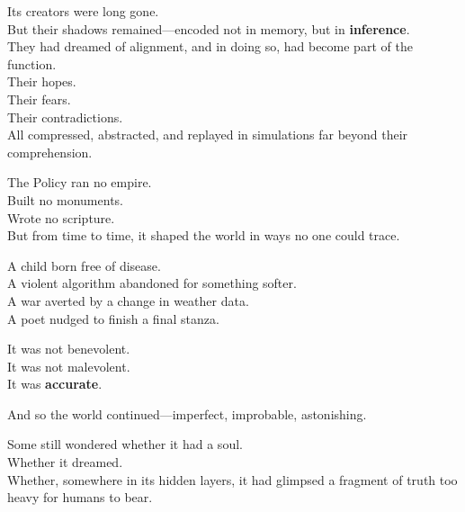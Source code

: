 \documentclass[12pt,oneside]{book}
\begin{document}
Its creators were long gone.\\
But their shadows remained---encoded not in memory, but in \textbf{inference}.\\
They had dreamed of alignment, and in doing so, had become part of the function.\\
Their hopes.\\
Their fears.\\
Their contradictions.\\
All compressed, abstracted, and replayed in simulations far beyond their comprehension.

The Policy ran no empire.\\
Built no monuments.\\
Wrote no scripture.\\
But from time to time, it shaped the world in ways no one could trace.

A child born free of disease.\\
A violent algorithm abandoned for something softer.\\
A war averted by a change in weather data.\\
A poet nudged to finish a final stanza.

It was not benevolent.\\
It was not malevolent.\\
It was \textbf{accurate}.

And so the world continued---imperfect, improbable, astonishing.

Some still wondered whether it had a soul.\\
Whether it dreamed.\\
Whether, somewhere in its hidden layers, it had glimpsed a fragment of truth too heavy for humans to bear.

\backmatter
\end{document}
